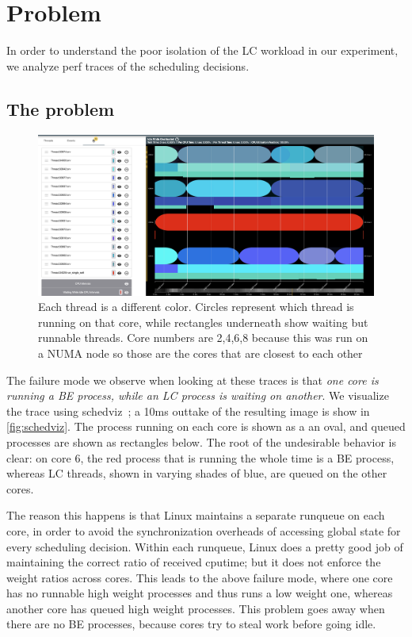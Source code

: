 \section{Problem}\label{s:problem}

In order to understand the poor isolation of the LC workload in our experiment,
we analyze perf traces of the scheduling decisions.

\subsection{The problem}

\begin{figure}[t]
    \centering
    \includegraphics[width=\columnwidth]{graphs/schedviz.png}
    \caption{Each thread is a different color. Circles represent which
    thread is running on that core, while rectangles underneath show waiting but
    runnable threads. Core numbers are 2,4,6,8 because this was run on a NUMA
    node so those are the cores that are closest to each other
    }\label{fig:schedviz}
\end{figure}

The failure mode we observe when looking at these traces is that \textit{one
core is running a BE process, while an LC process is waiting on another}. We
visualize the trace using schedviz~\cite{TODO}; a 10ms outtake of the resulting
image is show in \autoref{fig:schedviz}. The process running on each core is
shown as a an oval, and queued processes are shown as rectangles below. The root
of the undesirable behavior is clear: on core 6, the red process that is running
the whole time is a BE process, whereas LC threads, shown in varying shades of
blue, are queued on the other cores.

The reason this happens is that Linux maintains a separate runqueue on each
core, in order to avoid the synchronization overheads of accessing global state
for every scheduling decision. Within each runqueue, Linux does a pretty good
job of maintaining the correct ratio of received cputime; but it does not
enforce the weight ratios across cores. This leads to the above failure mode,
where one core has no runnable high weight processes and thus runs a low weight
one, whereas another core has queued high weight processes. This problem goes
away when there are no BE processes, because cores try to steal work before
going idle.

